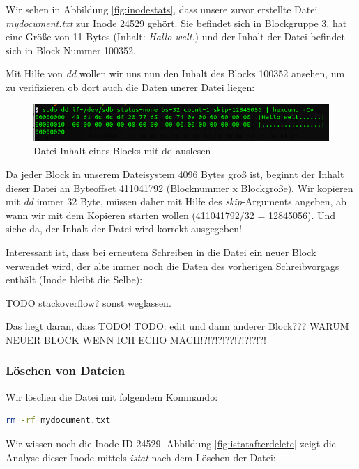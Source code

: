 Wir sehen in Abbildung \ref{fig:inodestats}, dass unsere zuvor erstellte Datei \textit{mydocument.txt} zur Inode 24529 gehört. Sie befindet sich in Blockgruppe 3, hat eine Größe von 11 Bytes (Inhalt: \textit{Hallo welt.}) und der Inhalt der Datei befindet sich in Block Nummer 100352.

Mit Hilfe von \textit{dd} wollen wir uns nun den Inhalt des Blocks 100352 ansehen, um zu verifizieren ob dort auch die Daten unerer Datei liegen:

\begin{figure}[H]
	\centering
	\includegraphics[width=12cm,keepaspectratio=true]{pictures/getfilecontent.png}
	\caption{
		Datei-Inhalt eines Blocks mit dd auslesen
	}
	\label{fig:getfilecontent}
\end{figure}

Da jeder Block in unserem Dateisystem 4096 Bytes groß ist, beginnt der Inhalt dieser Datei an Byteoffset 411041792 (Blocknummer x Blockgröße). Wir kopieren mit \textit{dd} immer 32 Byte, müssen daher mit Hilfe des \textit{skip}-Arguments angeben, ab wann wir mit dem Kopieren starten wollen (411041792/32 = 12845056). Und siehe da, der Inhalt der Datei wird korrekt ausgegeben!

Interessant ist, dass bei erneutem Schreiben in die Datei ein neuer Block verwendet wird, der alte immer noch die Daten des vorherigen Schreibvorgags enthält (Inode bleibt die Selbe):

TODO stackoverflow? sonst weglassen.

Das liegt daran, dass TODO!
TODO: edit und dann anderer Block??? WARUM NEUER BLOCK WENN ICH ECHO MACH!?!?!?!??!?!?!?!?!


\subsubsection{Löschen von Dateien}

Wir löschen die Datei mit folgendem Kommando:

\begin{lstlisting}[language=bash]
rm -rf mydocument.txt
\end{lstlisting} 

Wir wissen noch die Inode ID 24529. Abbildung \ref{fig:istatafterdelete} zeigt die Analyse dieser Inode mittels \textit{istat} nach dem Löschen der Datei:

